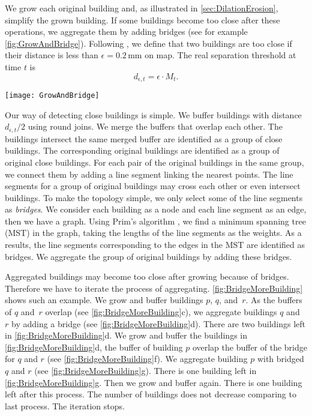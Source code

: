 We grow each original building and, as illustrated in 
\sect\ref{sec:DilationErosion}, simplify the grown building.
If some buildings become too close after these operations,
we aggregate them by adding bridges
(see for example \fig\ref{fig:GrowAndBridge}).
Following \citet{Stoter2009}, 
we define that two buildings are too close if their distance is less than
$\epsilon= 0.2\,\mathrm{mm}$ on map.
The real separation threshold at time $t$ is
\begin{equation}
\label{eq:d_epsilont}
d_{\epsilon, t} = \epsilon \cdot M_t.
\end{equation}

\begin{figure*}[tb]
	\centering
	\texttt{[image: GrowAndBridge]}
	\caption{Aggregating original buildings in the same group by introducing 
		bridges.
		Then grow the bridged buildings.}
	\label{fig:GrowAndBridge}
\end{figure*}

Our way of detecting close buildings is simple.
We buffer buildings with distance $d_{\epsilon, t}/2$ using round joins.
We merge the buffers that overlap each other.
The buildings intersect the same merged buffer 
are identified as a group of close buildings.
The corresponding original buildings 
are identified as a group of original close buildings.
For each pair of the original buildings in the same group,
we connect them by adding a line segment linking the nearest points.
The line segments for a group of original buildings may cross each other or 
even intersect buildings.
To make the topology simple, 
we only select some of the line segments as \emph{bridges}.  
We consider each building as a node and each line segment as an edge, 
then we have a graph.
Using Prim's algorithm \citep{Prim1957}, 
we find a minimum spanning tree (MST) in the graph,
taking the lengths of the line segments as the weights.
As a results, the line segments corresponding to the edges in the MST
are identified as bridges.
We aggregate the group of original buildings by adding these bridges.

Aggregated buildings may become too close after growing because of bridges.
Therefore we have to iterate the process of aggregating.
\fig\ref{fig:BridgeMoreBuilding} shows such an example.
We grow and buffer buildings $p$, $q$, and~$r$.
As the buffers of $q$ and~$r$ overlap
(see \fig\ref{fig:BridgeMoreBuilding}c),
we aggregate buildings $q$ and~$r$ by adding a bridge
(see \fig\ref{fig:BridgeMoreBuilding}d).
There are two buildings left in \fig\ref{fig:BridgeMoreBuilding}d.
We grow and buffer the buildings in 
\fig\ref{fig:BridgeMoreBuilding}d, 
the buffer of building $p$ overlap the buffer of the bridge for $q$ and $r$
(see \fig\ref{fig:BridgeMoreBuilding}f).
We aggregate building $p$ with bridged $q$ and $r$
(see \fig\ref{fig:BridgeMoreBuilding}g).
There is one building left in \fig\ref{fig:BridgeMoreBuilding}g.
Then we grow and buffer again.
There is one building left after this process.
The number of buildings does not decrease comparing to last process.
The iteration stops.

